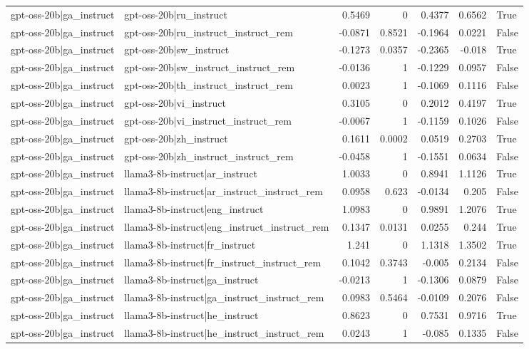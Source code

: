 \begin{table}
\begin{tabular}{l l r r r r l}
gpt-oss-20b|ga_instruct & gpt-oss-20b|ru_instruct & 0.5469 & 0 & 0.4377 & 0.6562 & True \\
gpt-oss-20b|ga_instruct & gpt-oss-20b|ru_instruct_instruct_rem & -0.0871 & 0.8521 & -0.1964 & 0.0221 & False \\
gpt-oss-20b|ga_instruct & gpt-oss-20b|sw_instruct & -0.1273 & 0.0357 & -0.2365 & -0.018 & True \\
gpt-oss-20b|ga_instruct & gpt-oss-20b|sw_instruct_instruct_rem & -0.0136 & 1 & -0.1229 & 0.0957 & False \\
gpt-oss-20b|ga_instruct & gpt-oss-20b|th_instruct_instruct_rem & 0.0023 & 1 & -0.1069 & 0.1116 & False \\
gpt-oss-20b|ga_instruct & gpt-oss-20b|vi_instruct & 0.3105 & 0 & 0.2012 & 0.4197 & True \\
gpt-oss-20b|ga_instruct & gpt-oss-20b|vi_instruct_instruct_rem & -0.0067 & 1 & -0.1159 & 0.1026 & False \\
gpt-oss-20b|ga_instruct & gpt-oss-20b|zh_instruct & 0.1611 & 0.0002 & 0.0519 & 0.2703 & True \\
gpt-oss-20b|ga_instruct & gpt-oss-20b|zh_instruct_instruct_rem & -0.0458 & 1 & -0.1551 & 0.0634 & False \\
gpt-oss-20b|ga_instruct & llama3-8b-instruct|ar_instruct & 1.0033 & 0 & 0.8941 & 1.1126 & True \\
gpt-oss-20b|ga_instruct & llama3-8b-instruct|ar_instruct_instruct_rem & 0.0958 & 0.623 & -0.0134 & 0.205 & False \\
gpt-oss-20b|ga_instruct & llama3-8b-instruct|eng_instruct & 1.0983 & 0 & 0.9891 & 1.2076 & True \\
gpt-oss-20b|ga_instruct & llama3-8b-instruct|eng_instruct_instruct_rem & 0.1347 & 0.0131 & 0.0255 & 0.244 & True \\
gpt-oss-20b|ga_instruct & llama3-8b-instruct|fr_instruct & 1.241 & 0 & 1.1318 & 1.3502 & True \\
gpt-oss-20b|ga_instruct & llama3-8b-instruct|fr_instruct_instruct_rem & 0.1042 & 0.3743 & -0.005 & 0.2134 & False \\
gpt-oss-20b|ga_instruct & llama3-8b-instruct|ga_instruct & -0.0213 & 1 & -0.1306 & 0.0879 & False \\
gpt-oss-20b|ga_instruct & llama3-8b-instruct|ga_instruct_instruct_rem & 0.0983 & 0.5464 & -0.0109 & 0.2076 & False \\
gpt-oss-20b|ga_instruct & llama3-8b-instruct|he_instruct & 0.8623 & 0 & 0.7531 & 0.9716 & True \\
gpt-oss-20b|ga_instruct & llama3-8b-instruct|he_instruct_instruct_rem & 0.0243 & 1 & -0.085 & 0.1335 & False \\

\end{tabular}
\end{table}
